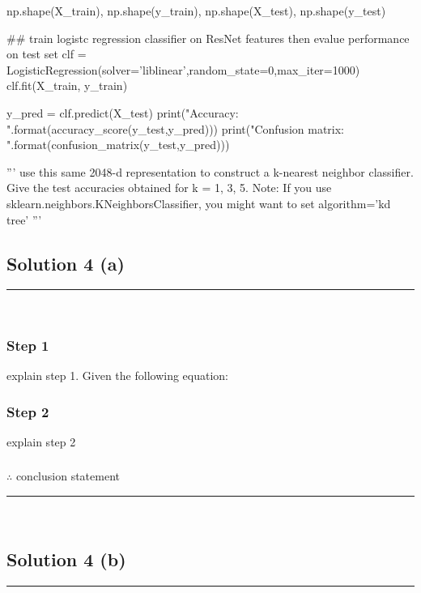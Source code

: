         np.shape(X_train), np.shape(y_train), np.shape(X_test), np.shape(y_test)

## train logistc regression classifier on ResNet features then evalue performance on test set
clf = LogisticRegression(solver='liblinear',random_state=0,max_iter=1000)
clf.fit(X_train, y_train)

y_pred = clf.predict(X_test)
print("Accuracy: {}\n".format(accuracy_score(y_test,y_pred)))
print("Confusion matrix: \n {}".format(confusion_matrix(y_test,y_pred)))

'''
use this same 2048-d representation to construct a k-nearest neighbor classifier. Give the test
accuracies obtained for k = 1, 3, 5. Note: If you use sklearn.neighbors.KNeighborsClassifier,
you might want to set algorithm='kd tree'
'''
\subsection*{Solution 4 (a)}
\noindent\rule{\textwidth}{0.4pt}\\

\subsubsection*{Step 1}
\parbox{\textwidth}{

explain step 1.
Given the following equation:\\

}

\subsubsection*{Step 2}
\parbox{\textwidth}{

explain step 2\\

}

\subsubsection*{\normalfont}{$\therefore$ conclusion statement}

\noindent\rule{\textwidth}{0.4pt}\\

\subsection*{Solution 4 (b)}
\noindent\rule{\textwidth}{0.4pt}\\

